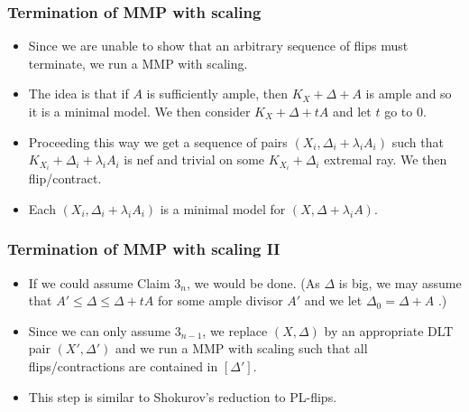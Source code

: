 \documentclass{beamer}
\theoremstyle{plain}
\theoremstyle{definition}
\theoremstyle{remark}
\begin{document}
\begin{frame}
\frametitle{Termination of MMP with scaling}
\begin{itemize}
\item Since we are unable to show that an arbitrary sequence of flips 
must terminate, we run a MMP with scaling.
\item The idea is that if $A$ is sufficiently ample, then $K_X+\Delta +A$ is ample and so it is a minimal model. We then consider $K_X+\Delta +tA$ and let $t$ go to $0$.
\item Proceeding this way we get a sequence of pairs $(X_i,\Delta _i+\lambda _i A_i)$ such that $K_{X_i}+\Delta _i+\lambda _i A_i$ is nef and trivial on some $K_{X_i}+\Delta _i$ extremal ray. We then flip/contract.
\item Each $(X_i,\Delta _i+\lambda _i A_i)$ is a minimal model for $(X,\Delta +\lambda _iA)$.
\end{itemize}
\end{frame}
\begin{frame}
\frametitle{Termination of MMP with scaling II}
\begin{itemize}
\item If we could assume Claim $3_n$, we would be done. 
(As $\Delta $ is big, we may assume that $A'\leq \Delta\leq \Delta +tA$ for some ample divisor $A'$ and we let  $\Delta_0=
\Delta +A$ .)
\item Since we can only assume $3_{n-1}$, we replace $(X,\Delta)$ by
an appropriate DLT pair $(X',\Delta ')$ and we run a MMP with scaling
such that all flips/contractions are contained in $[\Delta ']$.

\item This step is similar to Shokurov's reduction to PL-flips.
\end{itemize}
\end{frame}
\end{document}
